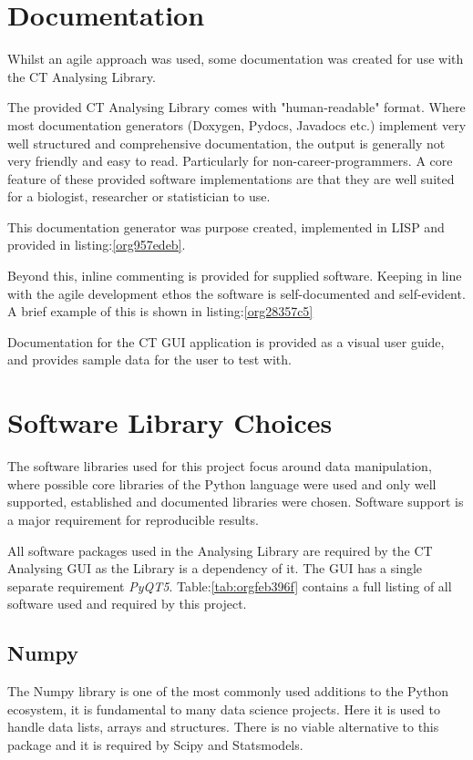 \documentclass[11pt]{report}
\begin{document}
\section{Documentation}
\label{sec:org13061b9}
Whilst an agile approach was used, some documentation was created for use with the CT Analysing Library.

The provided CT Analysing Library comes with "human-readable" format. Where most documentation generators (Doxygen, Pydocs, Javadocs etc.) implement very well structured and comprehensive documentation, the output is generally not very friendly and easy to read. Particularly for non-career-programmers. A core feature of these provided software implementations are that they are well suited for a biologist, researcher or statistician to use.

This documentation generator was purpose created, implemented in LISP and provided in listing:\ref{org957edeb}.

Beyond this, inline commenting is provided for supplied software. Keeping in line with the agile development ethos the software is self-documented and self-evident. A brief example of this is shown in listing:\ref{org28357c5}

Documentation for the CT GUI application is provided as a visual user guide, and provides sample data for the user to test with.
\section{Software Library Choices}
\label{sec:org40068dd}
The software libraries used for this project focus around data manipulation, where possible core libraries of the Python language were used and only well supported, established and documented libraries were chosen. Software support is a major requirement for reproducible results.

All software packages used in the Analysing Library are required by the CT Analysing GUI as the Library is a dependency of it. The GUI has a single separate requirement \emph{PyQT5}.
Table:\ref{tab:orgfeb396f} contains a full listing of all software used and required by this project.
\subsection{Numpy}
\label{sec:org1b4e4ae}
The Numpy library is one of the most commonly used additions to the Python ecosystem, it is fundamental to many data science projects. Here it is used to handle data lists, arrays and structures. There is no viable alternative to this package and it is required by Scipy and Statsmodels.
\end{document}
